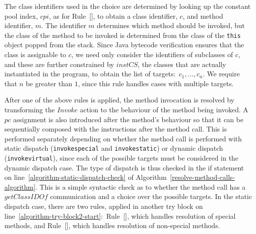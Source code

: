 The class identifiers used in the choice are determined by looking up
the constant pool index, $cpi$, as for
Rule~[], to obtain a class
identifier, $c$, and method identifier, $m$.
The identifier $m$ determines which method should be invoked, but the
class of the method to be invoked is determined from the class of the
\texttt{this} object popped from the stack.
Since Java bytecode verification ensures that the class is assignable
to $c$, we need only consider the identifiers of subclasses of $c$,
and these are further constrained by $instCS$, the classes that are
actually instantiated in the program, to obtain the list of targets:~$c_1, \ldots , c_n$.
We require that $n$ be greater than $1$, since this rule handles cases
with multiple targets.

After one of the above rules is applied, the method invocation is
resolved by transforming the $Invoke$ action to the behaviour of the
method being invoked.
A $pc$ assignment is also introduced after the
method's behaviour so that it can be sequentially composed with the
instructions after the method call.
This is performed separately depending on whether the method call is
performed with static dispatch (\texttt{invokespecial} and
\texttt{invokestatic}) or dynamic dispatch (\texttt{invokevirtual}),
since each of the possible targets must be considered in the dynamic
dispatch case.
The type of dispatch is thus checked in the if statement on
line~\ref{algorithm-static-dispatch-check} of
Algorithm~\ref{resolve-method-calls-algorithm}.
This is a simple syntactic check as to whether the method call has a
$getClassIDOf$ communication and a choice over the possible targets.
In the static dispatch case, there are two rules, applied in another
try block on
line~\ref{algorithm-try-block2-start}:~Rule~[],
which handles resolution of special methods, and
Rule~[], which handles resolution
of non-special methods.

